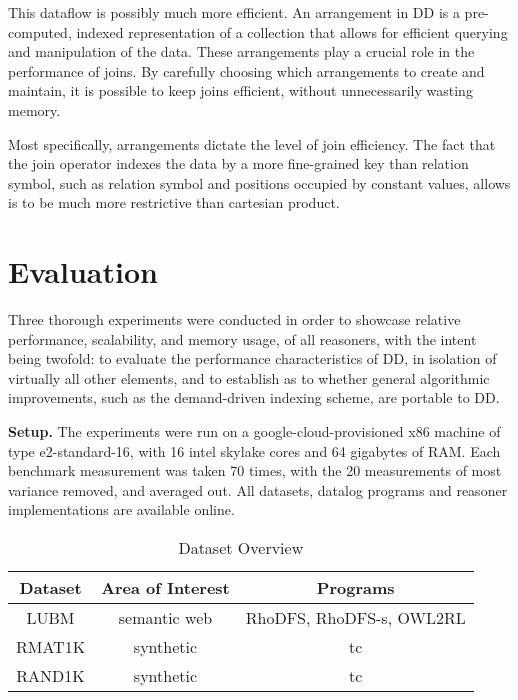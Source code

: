 \documentclass[sigconf,screen,review=false,natbib]{acmart}
\theoremstyle{definition}
\begin{document}
This dataflow is possibly much more efficient. An arrangement in DD is a pre-computed, indexed representation of a collection that allows for efficient
querying and manipulation of the data. These arrangements play a crucial role in the performance of joins. By carefully choosing which arrangements to
create and maintain, it is possible to keep joins efficient, without unnecessarily wasting memory.

Most specifically, arrangements dictate the level of join efficiency. The fact that the join operator indexes the data by a more fine-grained key than relation
symbol, such as relation symbol and positions occupied by constant values, allows is to be much more restrictive than cartesian product.
\section{Evaluation}
Three thorough experiments were conducted in order to showcase relative performance, scalability, and memory usage, of all reasoners, with the intent being twofold:
to evaluate the performance characteristics of DD, in isolation of virtually all other elements, and to establish as to whether general algorithmic
improvements, such as the demand-driven indexing scheme, are portable to DD.

\textbf{Setup.} The experiments were run on a google-cloud-provisioned x86 machine of type e2-standard-16, with 16 intel skylake cores and 64 gigabytes of RAM. Each
benchmark measurement was taken 70 times, with the 20 measurements of most variance removed, and averaged out. All datasets, datalog programs and reasoner implementations
are available online\cite{shapiro}.
\begin{table}
	\caption{Dataset Overview}
	\begin{tabular}{|c|c|c|}
		\hline
		Dataset & Area of Interest & Programs                 \\
		\hline
		LUBM    & semantic web     & RhoDFS, RhoDFS-s, OWL2RL \\
		\hline
		RMAT1K  & synthetic        & tc                       \\
		\hline
		RAND1K  & synthetic        & tc                       \\
		\hline
	\end{tabular}
	\label{tab:datasets}
\end{table}
\end{document}
